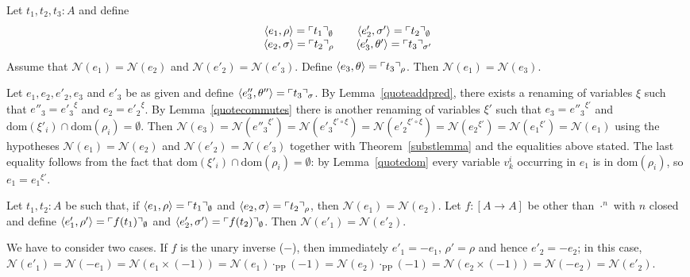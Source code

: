 \documentclass[numreferences]{kluwer}
\newcommand{\N}{\ensuremath{\mathcal{N}}}
\newcommand{\mlfn}[2]{\ensuremath\ulcorner{#1}\urcorner_{#2}}
\newcommand{\domain}{\ensuremath{\mathrm{dom}}}
\newcommand{\renamevar}[2]{\ensuremath{{#1}^{#2}}}
\newcommand{\isrenamevar}[3]{\ensuremath{{#1}=\renamevar{#2}{#3}}}
\newcommand{\multPP}{\ensuremath{\cdot_{\mathrm{PP}}}}
\begin{document}
\begin{article}
\begin{lemma}\label{set3}
Let $t_1,t_2,t_3:A$ and define
\[\begin{array}{ccc}
\langle e_1,\rho\rangle=\mlfn{t_1}{\emptyset}
 & & \langle e'_2,\sigma'\rangle=\mlfn{t_2}{\emptyset} \\
\langle e_2,\sigma\rangle=\mlfn{t_2}{\rho}
 & & \langle e'_3,\theta'\rangle=\mlfn{t_3}{\sigma'}
\end{array}\]
Assume that $\N(e_1)=\N(e_2)$ and $\N(e'_2)=\N(e'_3)$.  Define
$\langle e_3,\theta\rangle=\mlfn{t_3}{\rho}$.  Then $\N(e_1)=\N(e_3)$.
\end{lemma}
\begin{pf}
Let $e_1,e_2,e'_2,e_3$ and $e'_3$ be as given and define
$\langle e''_3,\theta''\rangle=\mlfn{t_3}{\sigma}$.
By Lemma~\ref{quoteaddpred},
there exists a renaming of variables $\xi$ such that
$\isrenamevar{e''_3}{e'_3}\xi$ and $\isrenamevar{e_2}{e'_2}\xi$.
By Lemma~\ref{quotecommutes} there is another renaming of variables $\xi'$
such that $\isrenamevar{e_3}{e''_3}{\xi'}$ and
$\domain(\xi'_i)\cap\domain(\rho_i)=\emptyset$. %
Then
$\N(e_3)%
=\N\left(\renamevar{e''_3}{\xi'}\right)%
=\N\left(\renamevar{e'_3}{\xi'\circ\xi}\right)%
=\N\left(\renamevar{e'_2}{\xi'\circ\xi}\right)%
=\N\left(\renamevar{e_2}{\xi'}\right)%
=\N\left(\renamevar{e_1}{\xi'}\right)%
=\N(e_1)$
using the hypotheses $\N(e_1)=\N(e_2)$ and $\N(e'_2)=\N(e'_3)$ together with 
Theorem~\ref{substlemma} and the equalities above stated.  The last equality
follows from the fact that $\domain(\xi'_i)\cap\domain(\rho_i)=\emptyset$: by
Lemma~\ref{quotedom} every variable $v^i_k$ occurring in $e_1$ is in
$\domain(\rho_i)$, so {\isrenamevar{e_1}{e_1}{\xi'}}.
\end{pf}

\begin{lemma}\label{set4}
Let $t_1,t_2:A$ be such that, if $\langle e_1,\rho\rangle=\mlfn{t_1}{\emptyset}$
and $\langle e_2,\sigma\rangle=\mlfn{t_2}{\rho}$, then $\N(e_1)=\N(e_2)$.
Let $f:[A\to A]$ be other than $\cdot^n$ with $n$ closed and define
$\langle e'_1,\rho'\rangle=\mlfn{f(t_1)}{\emptyset}$ and
$\langle e'_2,\sigma'\rangle=\mlfn{f(t_2)}{\emptyset}$.
Then $\N(e'_1)=\N(e'_2)$.
\end{lemma}
\begin{pf}
We have to consider two cases.  If $f$ is the unary inverse ($-$), then
immediately $e'_1=-e_1$, $\rho'=\rho$ and hence $e'_2=-e_2$; in this case,
$\N(e'_1)=\N(-e_1)=\N(e_1\times(-1))=\N(e_1)\multPP(-1)=\N(e_2)\multPP(-1)=%
\N(e_2\times(-1))=\N(-e_2)=\N(e'_2)$.


\end{pf}
\end{article}
\end{document}
